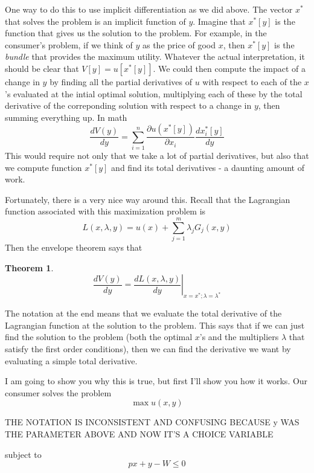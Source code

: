 \documentclass[12pt]{article}
\newtheorem{theorem}{Theorem}
\newcommand{\tmem}[1]{\textit{#1}}
\begin{document}
One way to do this to use implicit differentiation as we did above. The vector
$x^{\ast}$ that solves the problem is an implicit function of $y$. Imagine
that $x^{\ast} [ y ]$ is the function that gives us the solution to the
problem. For example, in the consumer's problem, if we think of $y$ as the
price of good $x$, then $x^{\ast} [ y ]$ is the {\tmem{bundle}} that provides
the maximum utility. Whatever the actual interpretation, it should be clear
that $V [ y ] = u [ x^{\ast} [ y ] ]$. We could then compute the impact of a
change in $y$ by finding all the partial derivatives of $u$ with respect to
each of the $x$'s evaluated at the intial optimal solution, multiplying each
of these by the total derivative of the correponding solution with respect to
a change in $y$, then summing everything up. In math
\[ \frac{d V ( y )}{d y} = \sum_{i = 1}^n \frac{\partial u ( x^{\ast} [ y ]
   )}{\partial x_i} \frac{d x^{\ast}_i [ y ]}{d y} \]
This would require not only that we take a lot of partial derivatives, but
also that we compute function $x^{\ast} [ y ]$ and find its total derivatives
- a daunting amount of work.

Fortunately, there is a very nice way around this. Recall that the Lagrangian
function associated with this maximization problem is
\[ L ( x, \lambda, y ) = u ( x ) + \sum_{j = 1}^m \lambda_j G_j ( x, y ) \]
Then the envelope theorem says that

\begin{theorem}
  \begin{equation}
    \left. \frac{d V ( y )}{d y} = \frac{d L ( x, \lambda, y )}{d y}
    \right|_{x = x^{\ast} ; \lambda = \lambda^{\ast}}
  \end{equation}
\end{theorem}

The notation at the end means that we evaluate the total derivative of the
Lagrangian function at the solution to the problem. This says that if we can
just find the solution to the problem (both the optimal $x$'s and the
multipliers $\lambda$ that satisfy the first order conditions), then we can
find the derivative we want by evaluating a simple total derivative.

I am going to show you why this is true, but first I'll show you how it works.
Our consumer solves the problem
\[ \max u ( x, y ) \]

THE NOTATION IS INCONSISTENT AND CONFUSING BECAUSE y WAS THE PARAMETER ABOVE AND NOW IT'S A CHOICE VARIABLE

subject to
\[ p x + y - W \leqslant 0 \]
\end{document}
